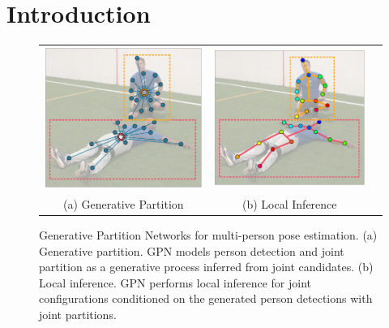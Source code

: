 \documentclass[10pt,twocolumn,letterpaper]{article}
\begin{document}
\section{Introduction}

\begin{figure}[t!]
\begin{center}
\setlength{\tabcolsep}{1.5pt}
\begin{tabular}{ccc}
\includegraphics[scale=0.56]{figs/fig1_1.pdf} & \includegraphics[scale=0.56]{figs/fig1_4.pdf} \\
{\fontsize{9pt}{9pt} \selectfont (a) Generative Partition} & {\fontsize{9pt}{9pt} \selectfont (b) Local Inference} \\
\end{tabular}
\vspace{0.5mm}
\caption{Generative Partition Networks for multi-person pose estimation. (a) Generative partition. GPN models person detection and joint partition as a generative process inferred from joint
candidates. (b) Local inference. GPN performs local inference for joint configurations conditioned on the generated person detections with joint partitions.}
\label{fig:fig1}
\end{center}
\end{figure}
\end{document}
